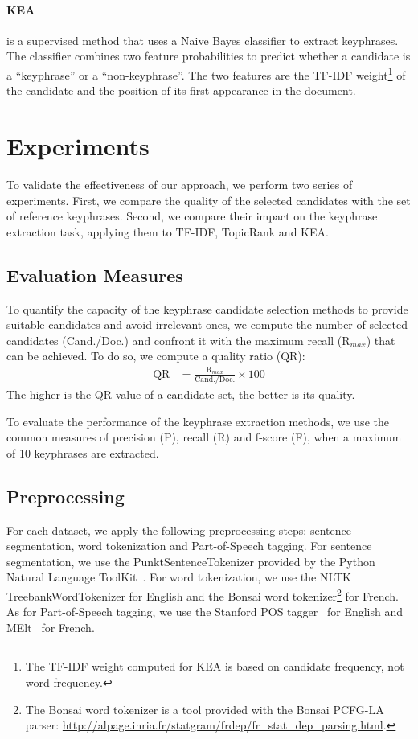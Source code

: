   \paragraph{KEA~\textnormal{\cite{witten1999kea}}} is a supervised method that
  uses a Naive Bayes classifier to extract keyphrases. The classifier combines
  two feature probabilities to predict whether a candidate is a ``keyphrase'' or
  a ``non-keyphrase''. The two features are the TF-IDF weight\footnote{The
    TF-IDF weight computed for KEA is based on candidate frequency, not word
  frequency.} of the candidate and the position of its first appearance in the
  document.

\section{Experiments}
\label{sec:evaluation}
  To validate the effectiveness of our approach, we perform two series of
  experiments. First, we compare the quality of the selected candidates with the
  set of reference keyphrases. Second, we compare their impact on the keyphrase
  extraction task, applying them to TF-IDF, TopicRank and KEA.

  \subsection{Evaluation Measures}
  \label{subsec:keyphrase_extraction_evaluation_measures}
    To quantify the capacity of the keyphrase candidate selection methods to
    provide suitable candidates and avoid irrelevant ones, we compute the
    number of selected candidates (Cand./Doc.) and confront it with the
    maximum recall (R$_{max}$) that can be achieved. To do so, we compute a quality
    ratio (QR):
    \begin{align}
      \text{QR} &= \frac{\text{R$_{max}$}}{\text{Cand./Doc.}} \times 100
    \end{align}
    The higher is the QR value of a candidate set, the better is its quality.

    To evaluate the performance of the keyphrase extraction methods, we use
    the common measures of precision (P), recall (R) and f-score (F), when a
    maximum of 10 keyphrases are extracted.

  \subsection{Preprocessing}
  \label{subsec:preprocessing}
    For each dataset, we apply the following preprocessing steps: sentence
    segmentation, word tokenization and Part-of-Speech tagging. For sentence
    segmentation, we use the PunktSentenceTokenizer provided by the Python
    Natural Language ToolKit~\cite[NLTK]{bird2009nltk}. For word tokenization,
    we use the NLTK TreebankWordTokenizer for English and the Bonsai word
    tokenizer\footnote{The Bonsai word tokenizer is a tool provided with the
    Bonsai PCFG-LA parser:
    \url{http://alpage.inria.fr/statgram/frdep/fr_stat_dep_parsing.html}.} for
    French. As for Part-of-Speech tagging, we use the Stanford
    POS tagger~\cite{toutanova2003stanfordpostagger} for English and
    MElt~\cite{denis2009melt} for French.


